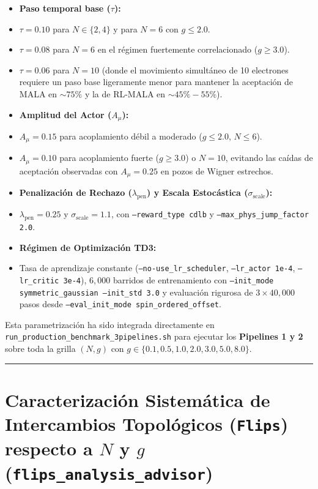 \documentclass[10pt,a4paper]{article}
\begin{document}
\begin{itemize}
\item \textbf{Paso temporal base ($\tau$):}
\item $\tau = 0.10$ para $N \in \{2, 4\}$ y para $N=6$ con $g \le 2.0$.
\item $\tau = 0.08$ para $N=6$ en el régimen fuertemente correlacionado ($g \ge 3.0$).
\item $\tau = 0.06$ para $N=10$ (donde el movimiento simultáneo de 10 electrones requiere un paso base ligeramente menor para mantener la aceptación de MALA en $\sim 75\%$ y la de RL-MALA en $\sim 45\%-55\%$).
\item \textbf{Amplitud del Actor ($A_\mu$):}
\item $A_\mu = 0.15$ para acoplamiento débil a moderado ($g \le 2.0$, $N \le 6$).
\item $A_\mu = 0.10$ para acoplamiento fuerte ($g \ge 3.0$) o $N=10$, evitando las caídas de aceptación observadas con $A_\mu = 0.25$ en pozos de Wigner estrechos.
\item \textbf{Penalización de Rechazo ($\lambda_{\mathrm{pen}}$) y Escala Estocástica ($\sigma_{\mathrm{scale}}$):}
\item $\lambda_{\mathrm{pen}} = 0.25$ y $\sigma_{\mathrm{scale}} = 1.1$, con \texttt{--reward\_type cdlb} y \texttt{--max\_phys\_jump\_factor 2.0}.
\item \textbf{Régimen de Optimización TD3:}
\item Tasa de aprendizaje constante (\texttt{--no-use\_lr\_scheduler}, \texttt{--lr\_actor 1e-4}, \texttt{--lr\_critic 3e-4}), $6,000$ barridos de entrenamiento con \texttt{--init\_mode symmetric\_gaussian --init\_std 3.0} y evaluación rigurosa de $3 \times 40,000$ pasos desde \texttt{--eval\_init\_mode spin\_ordered\_offset}.
\end{itemize}



Esta parametrización ha sido integrada directamente en \texttt{run\_production\_benchmark\_3pipelines.sh} para ejecutar los \textbf{Pipelines 1 y 2} sobre toda la grilla $(N, g)$ con $g \in \{0.1, 0.5, 1.0, 2.0, 3.0, 5.0, 8.0\}$.




\vspace{0.4cm}\hrule\vspace{0.4cm}




\section{Caracterización Sistemática de Intercambios Topológicos (\texttt{Flips}) respecto a $N$ y $g$ (\texttt{flips\_analysis\_advisor})}
\end{document}

